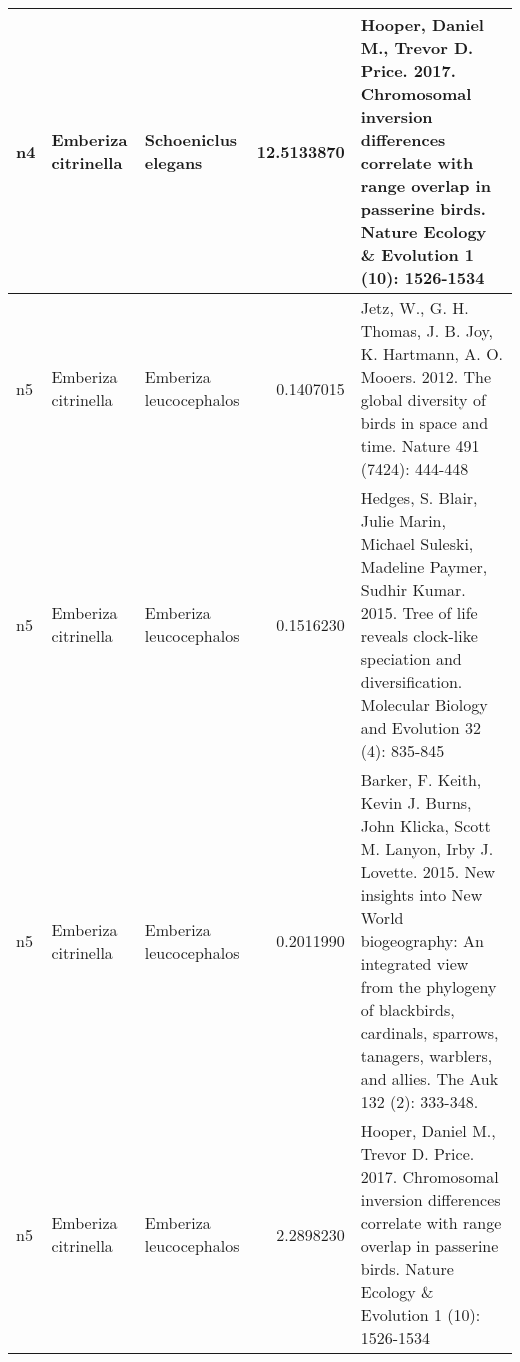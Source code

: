 \begin{tabular}{l|l|l|r|l}
\hline
n4 & Emberiza citrinella & Schoeniclus elegans & 12.5133870 & Hooper, Daniel M., Trevor D. Price. 2017. Chromosomal inversion differences correlate with range overlap in passerine birds. Nature Ecology \& Evolution 1 (10): 1526-1534\\
\hline
n5 & Emberiza citrinella & Emberiza leucocephalos & 0.1407015 & Jetz, W., G. H. Thomas, J. B. Joy, K. Hartmann, A. O. Mooers. 2012. The global diversity of birds in space and time. Nature 491 (7424): 444-448\\
\hline
n5 & Emberiza citrinella & Emberiza leucocephalos & 0.1516230 & Hedges, S. Blair, Julie Marin, Michael Suleski, Madeline Paymer, Sudhir Kumar. 2015. Tree of life reveals clock-like speciation and diversification. Molecular Biology and Evolution 32 (4): 835-845\\
\hline
n5 & Emberiza citrinella & Emberiza leucocephalos & 0.2011990 & Barker, F. Keith, Kevin J. Burns, John Klicka, Scott M. Lanyon, Irby J. Lovette. 2015. New insights into New World biogeography: An integrated view from the phylogeny of blackbirds, cardinals, sparrows, tanagers, warblers, and allies. The Auk 132 (2): 333-348.\\
\hline
n5 & Emberiza citrinella & Emberiza leucocephalos & 2.2898230 & Hooper, Daniel M., Trevor D. Price. 2017. Chromosomal inversion differences correlate with range overlap in passerine birds. Nature Ecology \& Evolution 1 (10): 1526-1534\\
\hline
\end{tabular}
